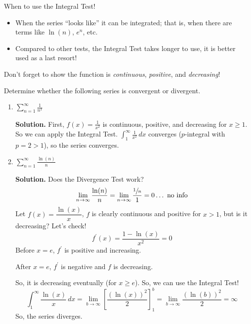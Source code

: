\begin{Remark}{}{}
    When to use the Integral Test!
    \begin{itemize}
        \item When the series ``looks like'' it can be integrated; that is, when there
              are terms like $ \ln(n) $, $ e^n $, etc.
        \item Compared to other tests, the Integral Test takes longer to use, it is better used
              as a last resort!
    \end{itemize}
\end{Remark}

\begin{Remark}{}{}
    Don't forget to show the function is \emph{continuous}, \emph{positive}, and
    \emph{decreasing}!
\end{Remark}

\begin{Example}{}{}
    Determine whether the following series is convergent or divergent.
    \begin{enumerate}[label=(\roman*)]
        \item $ \displaystyle \sum\limits_{n=1}^{\infty} \frac{1}{n^2} $

              \textbf{Solution.} First, $ \displaystyle  f(x)=\frac{1}{x^2} $ is continuous, positive,
              and decreasing for $ x\geqslant 1 $. So we can apply the Integral Test.
              $ \displaystyle \int_{1}^{\infty} \frac{1}{x^2} \, d{x} $ converges ($ p $-integral
              with $ p=2>1 $), so the series converges.
        \item $  \displaystyle\sum\limits_{n=1}^{\infty} \frac{\ln(n)}{n} $

              \textbf{Solution.} Does the Divergence Test work?
              \[ \lim\limits_{{n} \to {\infty}} \frac{\ln(n)}{n}=
                  \lim\limits_{{n} \to {\infty}} \frac{\sfrac{1}{n}}{1} =0\ldots\text{ no info} \]
              Let $ f(x)=\dfrac{\ln(x)}{x} $, $ f $ is clearly continuous and positive for $ x>1 $,
              but is it decreasing? Let's check!
              \[ f^\prime(x)=\frac{1-\ln(x)}{x^2}=0 \]
              Before $ x=e $, $ f^\prime $ is positive and increasing.

              After $ x=e $, $ f^\prime $ is negative
              and $ f $ is decreasing.

              So, it is decreasing eventually (for $ x\geqslant e $). So,
              we can use the Integral Test!
              \[ \int_{1}^{\infty} \frac{\ln(x)}{x} \, d{x}
                  =\lim\limits_{{b} \to {\infty}} \left[ \frac{\left( \ln(x) \right)^2}{2} \right]_1^b
                  =\lim\limits_{{b} \to {\infty}} \frac{\left( \ln(b) \right)^2}{2}=\infty   \]
              So, the series diverges.
    \end{enumerate}
\end{Example}

